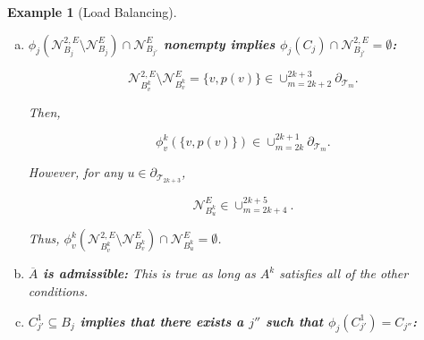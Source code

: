 \documentclass[12pt]{article}
\newcommand{\mc}{\mathcal}
\newcommand{\ov}{\overline}
\newcommand{\tr}{\textcolor{red}}
\newcommand{\bdry}[1]{\partial_{#1}}				%
\newcommand{\indx}[1]{^{#1}}						%
\newcommand{\eneigh}[1]{\mc{N}^E_{#1}}				%
\newcommand{\deneigh}[1]{\mc{N}^{2,E}_{#1}}			%
\newcommand{\tree}[1]{\mc{T}_{#1}}					%
\newcommand{\desc}{d}								%
\newtheorem{example}[thms]{Example}
\begin{document}
\begin{example}[Load Balancing]
\begin{description}
\begin{enumerate}[(a)]
\[\eneigh{B\indx{k}_v} = \left(\bigcup_{m=2k+4}^{2k+5}\bdry{\tree{m}}\right)\cap \desc(v) \subseteq \phi\indx{k}_{v'}(C\indx{k}_{v'}).\]

So it should be clear that if \(\deneigh{B\indx{k}_v} = \left(\desc(v)\cap A\indx{k}\right)\cup\{v,p(v)\}\) is non-empty, then \(p^2(v) = \phi\indx{k}_{v'}(v')\). Since descendants of \(p(v')\) are preserved under \(\phi\indx{k}_{v'}\), it follows that descendants of \(p^3(v')\) are preserved under the inverse \tr{(be a little more clear what this means)}. Thus,

\[C\indx{k}_{v'}\supseteq (\phi\indx{k}_{v'})^{-1}(\eneigh{B\indx{k}_v}) = \left(\bigcup_{m=2k+6}^{2k+7}\bdry{\tree{m}}\right)\cap \desc((\phi\indx{k}_{v'})^{-1}(v)) = \eneigh{B\indx{k+1}_{(\phi\indx{k}_{v'})^{-1}(v)}}\]

Furthermore,

\[\deneigh{B\indx{k}_v} = \eneigh{B\indx{k}_v}\cup\{v,p(v)\},\]

so

\[(\phi\indx{k}_{v'})^{-1}(\deneigh{B\indx{k}_v}) = \eneigh{B\indx{k+1}_{(\phi\indx{k}_{v'})^{-1}(v)}} \cup \{(\phi\indx{k}_{v'})^{-1}(v),p((\phi\indx{k}_{v'})^{-1}(v))\} = \deneigh{B\indx{k+1}_{(\phi\indx{k}_{v'})^{-1}(v)}}.\]

\item {\bfseries\boldmath \(\phi_j(\deneigh{B_j}\setminus \eneigh{B_j})\cap \eneigh{B_{j'}}\) nonempty implies \(\phi_j(C_j)\cap\deneigh{B_{j'}} = \emptyset\):}

\[\deneigh{B\indx{k}_v}\setminus \eneigh{B\indx{k}_v} = \{v,p(v)\} \in \cup_{m=2k+2}^{2k+3}\bdry{\tree{m}}.\]

Then,

\[\phi\indx{k}_v(\{v,p(v)\}) \in \cup_{m=2k}^{2k+1}\bdry{\tree{m}}.\]

However, for any \(u\in \bdry{\tree{2k+3}}\), 

\[\eneigh{B\indx{k}_u} \in \cup_{m=2k+4}^{2k+5}.\]

Thus, \(\phi\indx{k}_v(\deneigh{B\indx{k}_v}\setminus \eneigh{B\indx{k}_v}) \cap \eneigh{B\indx{k}_u} = \emptyset\).

\item {\bfseries\boldmath \(\ov{A}\) is admissible:} This is true as long as \(A\indx{k}\) satisfies all of the other conditions.

\item {\bfseries\boldmath \(C\indx{1}_{j'} \subseteq B_j\) implies that there exists a \(j''\) such that \(\phi_j(C\indx{1}_{j'}) = C_{j''}\):} 


\end{enumerate}
\end{description}
\end{example}
\end{document}
